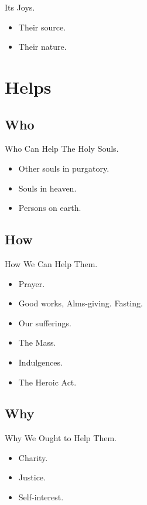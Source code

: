 \documentclass{beamer}
\begin{document}
\begin{frame}{Its Joys.}
\begin{itemize}
 \item Their source.
 \item Their nature.
\end{itemize}
\end{frame}

\section{Helps}

\subsection{Who}

\begin{frame}{Who Can Help The Holy Souls.}
\begin{itemize}
 \item Other souls in purgatory.
 \item Souls in heaven.
 \item Persons on earth.
\end{itemize}
\end{frame}

\subsection{How}

\begin{frame}{How We Can Help Them.}
\begin{itemize}
 \item Prayer.
 \item Good works, Alms-giving. Fasting.
 \item Our sufferings.
 \item The Mass.
 \item Indulgences.
 \item The Heroic Act.
\end{itemize}
\end{frame}

\subsection{Why}

\begin{frame}{Why We Ought to Help Them.}
\begin{itemize}
 \item Charity.
 \item Justice.
 \item Self-interest.
\end{itemize}
\end{frame}
\end{document}
